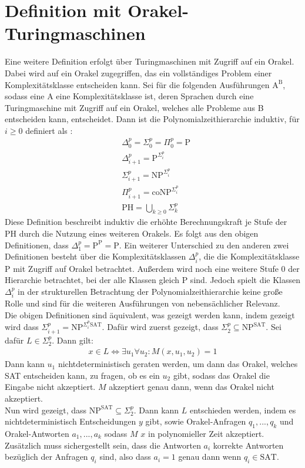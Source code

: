 \section{Definition mit Orakel-Turingmaschinen} \label{section: Definition PH mit Orakel-Turingmaschinen}
Eine weitere Definition erfolgt über Turingmaschinen mit Zugriff auf ein Orakel. Dabei wird auf ein Orakel zugegriffen,
das ein vollständiges Problem einer Komplexitätsklasse entscheiden kann. Sei für die folgenden Ausführungen $\text{A}^\text{B}$, sodass eine A eine Komplexitätsklasse ist, deren Sprachen durch eine Turingmaschine mit Zugriff auf ein Orakel, welches alle Probleme aus B entscheiden kann, entscheidet. 
Dann ist die Polynomialzeithierarchie induktiv, für $i \geq 0$ definiert als \cite{rothe_komplexitatstheorie_2008}:
\begin{align*}
    & \Delta^p_0 = \Sigma^p_0 = \Pi^p_0 = \text{P} \\
    & \Delta^p_{i+1} = \text{P}^{\Sigma^p_i} \\
    &\Sigma^p_{i+1} = \text{NP}^{\Sigma^p_i} \\
    & \Pi^p_{i+1} = \text{coNP}^{\Sigma^p_i} \\
    & \text{PH} = \bigcup_{k \geq 0} \Sigma^p_k
\end{align*}
Diese Definition beschreibt induktiv die erhöhte Berechnungskraft je Stufe der PH durch die Nutzung eines weiteren Orakels.
Es folgt aus den obigen Definitionen, dass $\Delta^p_1 = \text{P}^\text{P} = \text{P}$.
Ein weiterer Unterschied zu den anderen zwei Definitionen besteht über die Komplexitätsklassen $\Delta^p_i$, die die Komplexitätsklasse P
mit Zugriff auf Orakel betrachtet. Außerdem wird noch eine weitere Stufe $0$ der Hierarchie betrachtet, bei der alle Klassen gleich P sind.
Jedoch spielt die Klassen $\Delta^p_i$ in der strukturellen Betrachtung der Polynomialzeithierarchie keine große
Rolle und sind für die weiteren Ausführungen von nebensächlicher Relevanz. \\

\noindent Die obigen Definitionen sind äquivalent, was gezeigt werden kann, indem gezeigt wird dass $\Sigma^p_{i+1} = \text{NP}^{\Sigma^p_i \text{SAT}}$.
Dafür wird zuerst gezeigt, dass $\Sigma^p_2 \subseteq \text{NP}^{\text{SAT}}$. Sei dafür $L \in \Sigma^p_2$. Dann gilt: 
\begin{align*}
    x \in L \Leftrightarrow \exists u_1 \forall u_2 : M(x, u_1, u_2) = 1
\end{align*}
Dann kann $u_1$ nichtdeterministisch geraten werden, um dann das Orakel, welches SAT entscheiden kann, zu fragen, ob es ein $u_2$ gibt, sodass das Orakel die Eingabe nicht akzeptiert.
$M$ akzeptiert genau dann, wenn das Orakel nicht akzeptiert. \\
Nun wird gezeigt, dass $\text{NP}^{\text{SAT}} \subseteq \Sigma^p_2 $. Dann kann $L$ entschieden werden, indem es nichtdeterministisch Entscheidungen $y$ gibt, 
sowie Orakel-Anfragen $q_1, ..., q_k$ und Orakel-Antworten $a_1, ..., a_k$ sodass $M$ $x$ in polynomieller Zeit akzeptiert. Zusätzlich muss sichergestellt sein, 
dass die Antworten $a_i$ korrekte Antworten bezüglich der Anfragen $q_i$ sind, also dass $a_i = 1$ genau dann wenn  $q_i \in \text{SAT}$.
